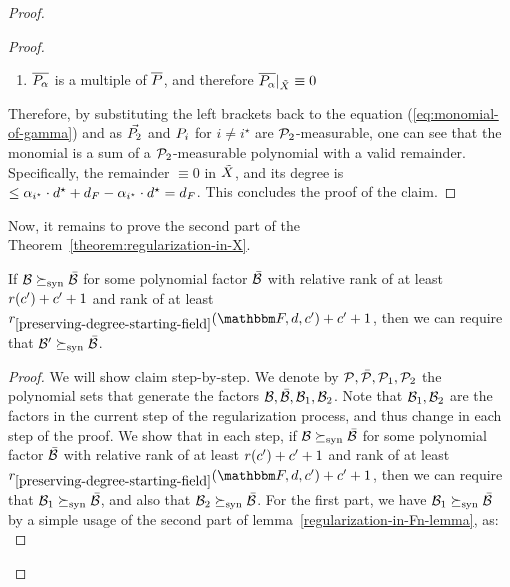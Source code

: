 \begin{proof}
\begin{proof}
\begin{enumerate}
            \item $\relativeremainder{\genpoly_{\alpha}}$ is a multiple of $\relativeremainder{\genpoly}$, and therefore $\restrictfunc{\relativeremainder{\genpoly_{\alpha}}}{\variety} \equiv 0$
        \end{enumerate}
        Therefore, by substituting the left brackets back to the equation (\ref{eq:monomial-of-gamma}) and as $\vec{\genpoly_2}$ and $\genpoly_i$ for $i \neq i^{\star}$ are $\genpolyset_2$-measurable,
        one can see that the monomial is a sum of a $\genpolyset_2$-measurable polynomial with a valid remainder.
        Specifically, the remainder $\equiv 0$ in ${\tilde{X}}$, and its degree is $\leq \alpha_{i^\star} \cdot \degree^{\star} + \degree_{\genfunc} - \alpha_{i^\star} \cdot \degree^{\star} = \degree_{\genfunc}$.
        This concludes the proof of the claim.
        \end{proof}
    Now, it remains to prove the second part of the Theorem~{\ref{theorem:regularization-in-X}}.
    \begin{claim}
        If $\mathcal{B} \succeq_{\text{syn}} \bar{\mathcal{B}}$ for some polynomial factor $\bar{\mathcal{B}}$ with
        relative rank of at least ${{{r}}}(c^\prime)+c^\prime+1$ and rank of at least ${\rankfunc_{\ref{preserving-degree-starting-field}}(\basefield, \degree, c^{\prime})} + c^\prime + 1$,
        then we can require that $\mathcal{B}^\prime \succeq_{\text{syn}} \bar{\mathcal{B}}$.
    \end{claim}
    \begin{proof}
        We will show claim step-by-step.
        We denote by $\genpolyset, \bar{\genpolyset}, \genpolyset_1, \genpolyset_2$ the polynomial sets that generate the factors $\mathcal{B}, \bar{\mathcal{B}}, \mathcal{B}_1, \mathcal{B}_2$.
        Note that $\mathcal{B}_1, \mathcal{B}_2$ are the factors in the current step of the regularization process, and thus change in each step of the proof.
        We show that in each step, if $\mathcal{B} \succeq_{\text{syn}} \bar{\mathcal{B}}$ for some polynomial factor $\bar{\mathcal{B}}$ with
        relative rank of at least ${{{r}}}(c^\prime)+c^\prime+1$ and rank of at least ${\rankfunc_{\ref{preserving-degree-starting-field}}(\basefield, \degree, c^{\prime})} + c^\prime + 1$,
        then we can require that $\mathcal{B}_1 \succeq_{\text{syn}} \bar{\mathcal{B}}$, and also that $\mathcal{B}_2 \succeq_{\text{syn}} \bar{\mathcal{B}}$.
        \newline
        For the first part, we have $\mathcal{B}_1 \succeq_{\text{syn}} \bar{\mathcal{B}}$ by a simple usage of the second part of lemma~\ref{regularization-in-Fn-lemma},
        as:
        \[
\]
\end{proof}
\end{proof}
